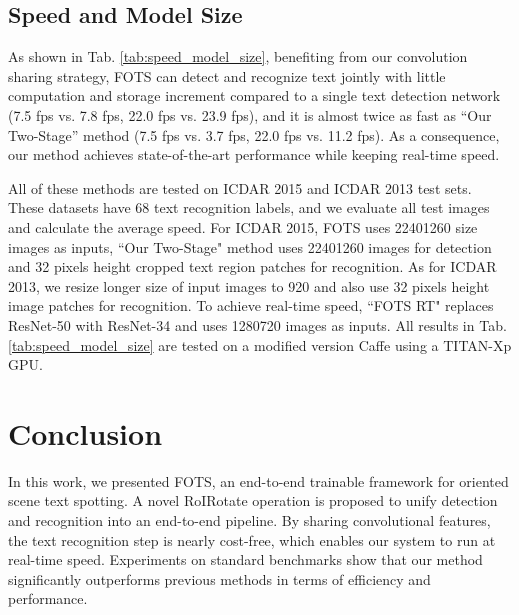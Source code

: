 \documentclass[10pt,twocolumn,letterpaper]{article}
\begin{document}
\subsection{Speed and Model Size}
\label{speed}
As shown in Tab. \ref{tab:speed_model_size}, benefiting from our convolution sharing strategy, FOTS can detect and recognize text jointly with little computation and storage increment compared to a single text detection network (7.5 fps vs. 7.8 fps, 22.0 fps vs. 23.9 fps), and it is almost twice as fast as ``Our Two-Stage'' method (7.5 fps vs. 3.7 fps, 22.0 fps vs. 11.2 fps). As a consequence, our method achieves state-of-the-art performance while keeping real-time speed.

All of these methods are tested on ICDAR 2015 and ICDAR 2013 test sets. These datasets have 68 text recognition labels, and we evaluate all test images and calculate the average speed. For ICDAR 2015, FOTS uses 22401260 size images as inputs, ``Our Two-Stage" method uses 22401260 images for detection and 32 pixels height cropped text region patches for recognition. As for ICDAR 2013, we resize longer size of input images to 920 and also use 32 pixels height image patches for recognition. To achieve real-time speed, ``FOTS RT" replaces ResNet-50 with ResNet-34 and uses 1280720 images as inputs. All results in Tab. \ref{tab:speed_model_size} are tested on a modified version Caffe \cite{jia2014caffe} using a TITAN-Xp GPU.

\section{Conclusion}

In this work, we presented FOTS, an end-to-end trainable framework for oriented scene text spotting. A novel RoIRotate operation is proposed to unify detection and recognition into an end-to-end pipeline. By sharing convolutional features, the text recognition step is nearly cost-free, which enables our system to run at real-time speed. Experiments on standard benchmarks show that our method significantly outperforms previous methods in terms of efficiency and performance.

{\small


}
\end{document}
